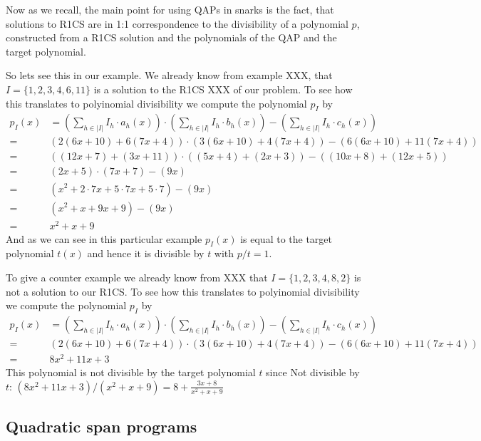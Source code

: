 \begin{example}
Now as we recall, the main point for using QAPs in snarks is the fact, that solutions to R1CS are in 1:1 correspondence to the divisibility of a polynomial $p$, constructed from a R1CS solution and the polynomials of the QAP and the target polynomial.

So lets see this in our example. We already know from example XXX, that 
$I=\{1,2,3,4,6,11\}$ is a solution to the R1CS XXX of our problem. To see how this translates to polyinomial divisibility we compute the polynomial $p_I$ by
\begin{align*}
p_I(x)& = (\sum_{h\in |I|} I_h\cdot a_h(x))\cdot 
(\sum_{h\in |I|} I_h\cdot b_h(x)) - 
(\sum_{h\in |I|} I_h\cdot c_h(x)) \\
= & (2(6x+10)+6(7x+4))\cdot(3(6x+10)+4(7x+4))-(6(6x+10)+11(7x+4)) \\
= & ((12x+7)+(3x+11))\cdot((5x+4)+(2x+3))-((10x+8)+(12x+5)) \\
= & (2x+5)\cdot(7x+7)-(9x) \\
= & (x^{2}+2\cdot7x+5\cdot7x+5\cdot7)-(9x) \\
= & (x^{2}+x+9x+9)-(9x) \\
= & x^{2}+x+9
\end{align*}
And as we can see in this particular example $p_I(x)$ is equal to the target polynomial $t(x)$ and hence it is divisible by $t$ with $p/t=1$.

To give a counter example we already know from XXX that $I=\{1,2,3,4,8, 2\}$ is not a solution to our R1CS. To see how this translates to polyinomial divisibility we compute the polynomial $p_I$ by
\begin{align*}
p_I(x)& = (\sum_{h\in |I|} I_h\cdot a_h(x))\cdot 
(\sum_{h\in |I|} I_h\cdot b_h(x)) - 
(\sum_{h\in |I|} I_h\cdot c_h(x)) \\
= & (2(6x+10)+6(7x+4))\cdot(3(6x+10)+4(7x+4))-(6(6x+10)+11(7x+4)) \\
= & 8x^{2}+11x+3
\end{align*}
This polynomial is not divisible by the target polynomial $t$ since
Not divisible by $t$: $(8x^{2}+11x+3)/(x^{2}+x+9) =8+\frac{3x+8}{x^{2}+x+9} $
\end{example}



\subsection{Quadratic span programs}

